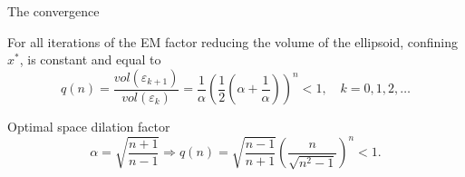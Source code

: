 \begin{frame}{The convergence}

\begin{rustheorem}
For all iterations of the EM factor reducing the volume of the ellipsoid, confining $x^*$, is constant and equal to
$$
q(n)=\frac{vol(\varepsilon_{k+1})}{vol(\varepsilon_k)}=\frac{1}{\alpha}\left(\frac{1}{2}\left(\alpha+\frac{1}{\alpha}\right)\right)^n<1,\quad k=0,1,2,\ldots
$$
\end{rustheorem}

\begin{block}{Optimal space dilation factor}
$$\alpha=\sqrt{\frac{n+1}{n-1}}\Rightarrow q(n)=\sqrt{\frac{n-1}{n+1}}\left(\frac{n}{\sqrt{n^2-1}}\right)^{n}<1.$$
\end{block}

\end{frame}